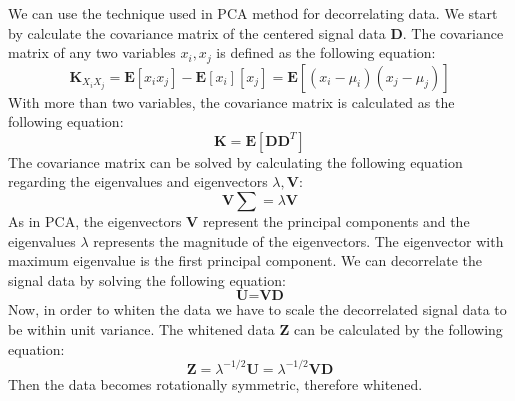 We can use the technique used in PCA method for decorrelating data. We start by calculate the covariance matrix of the centered signal data \textbf{D}. The covariance matrix of any two variables $x_{i}, x_{j}$ is defined as the following equation:
\begin{equation}
    \textbf{K}_{X_{i}X_{j}} = \textbf{E}[x_{i}x_{j}] - \textbf{E}[x_{i}][x_{j}] = \textbf{E}[(x_{i}-\mu_{i})(x_{j}-\mu_{j})]
\end{equation}
With more than two variables, the covariance matrix is calculated as the following equation:
\begin{equation}
    \textbf{K} = \textbf{E}[\textbf{D}\textbf{D}^{T}]
\end{equation}
The covariance matrix can be solved by calculating the following equation regarding the eigenvalues and eigenvectors $\lambda, \textbf{V}$:
\begin{equation}
    \textbf{V}\sum = \lambda\textbf{V}
\end{equation}
As in PCA, the eigenvectors \textbf{V} represent the principal components and the eigenvalues $\lambda$ represents the magnitude of the eigenvectors. The eigenvector with maximum eigenvalue is the first principal component.
We can decorrelate the signal data by solving the following equation:
\begin{equation}
    \textbf{U} = \textbf{V}\textbf{D}
\end{equation}
Now, in order to whiten the data we have to scale the decorrelated signal data to be within unit variance. The whitened data \textbf{Z} can be calculated by the following equation:
\begin{equation}
    \textbf{Z} = \lambda^{-1/2}\textbf{U} = \lambda^{-1/2}\textbf{V}\textbf{D}
\end{equation}
Then the data becomes rotationally symmetric, therefore whitened.

